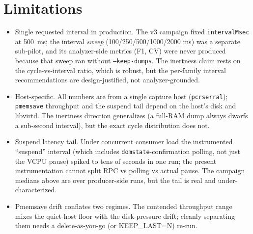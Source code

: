 \documentclass[conference]{IEEEtran}
\begin{document}
\section{Limitations}
\begin{itemize}
  \item Single requested interval in production. The v3 campaign fixed
        \texttt{intervalMsec} at \SI{500}{\milli\second}; the interval
        \emph{sweep} (100/250/500/1000/2000 ms) was a separate sub-pilot, and
        its analyzer-side metrics (F1, CV) were never produced because that
        sweep ran without \texttt{--keep-dumps}. The inertness claim rests on
        the cycle-vs-interval ratio, which is robust, but the per-family
        interval recommendations are design-justified, not analyzer-grounded.
  \item Host-specific. All numbers are from a single capture host
        (\texttt{pcrserral}); \texttt{pmemsave} throughput and the suspend
        tail depend on the host's disk and libvirtd. The inertness direction
        generalizes (a full-RAM dump always dwarfs a sub-second interval), but
        the exact cycle distribution does not.
  \item Suspend latency tail. Under concurrent consumer load the
        instrumented ``suspend'' interval (which includes
        \texttt{domstate}-confirmation polling, not just the VCPU pause)
        spiked to tens of seconds in one run; the present instrumentation
        cannot split RPC vs polling vs actual pause. The campaign medians
        above are over producer-side runs, but the tail is real and
        under-characterized.
  \item Pmemsave drift conflates two regimes. The contended throughput range
        mixes the quiet-host floor with the disk-pressure drift; cleanly
        separating them needs a delete-as-you-go (or KEEP\_LAST=N) re-run.
\end{itemize}

\end{document}
